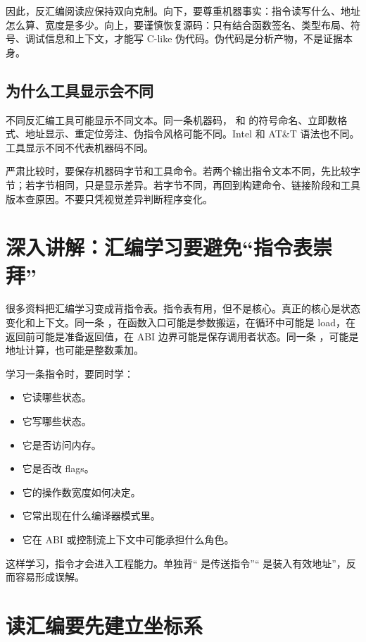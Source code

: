 因此，反汇编阅读应保持双向克制。向下，要尊重机器事实：指令读写什么、地址怎么算、宽度是多少。向上，要谨慎恢复源码：只有结合函数签名、类型布局、符号、调试信息和上下文，才能写 C-like 伪代码。伪代码是分析产物，不是证据本身。

\subsection{为什么工具显示会不同}

不同反汇编工具可能显示不同文本。同一条机器码， 和  的符号命名、立即数格式、地址显示、重定位旁注、伪指令风格可能不同。Intel 和 AT\&T 语法也不同。工具显示不同不代表机器码不同。

严肃比较时，要保存机器码字节和工具命令。若两个输出指令文本不同，先比较字节；若字节相同，只是显示差异。若字节不同，再回到构建命令、链接阶段和工具版本查原因。不要只凭视觉差异判断程序变化。

\section{深入讲解：汇编学习要避免“指令表崇拜”}

很多资料把汇编学习变成背指令表。指令表有用，但不是核心。真正的核心是状态变化和上下文。同一条 ，在函数入口可能是参数搬运，在循环中可能是 load，在返回前可能是准备返回值，在 ABI 边界可能是保存调用者状态。同一条 ，可能是地址计算，也可能是整数乘加。

学习一条指令时，要同时学：

\begin{itemize}
  \item 它读哪些状态。
  \item 它写哪些状态。
  \item 它是否访问内存。
  \item 它是否改 flags。
  \item 它的操作数宽度如何决定。
  \item 它常出现在什么编译器模式里。
  \item 它在 ABI 或控制流上下文中可能承担什么角色。
\end{itemize}

这样学习，指令才会进入工程能力。单独背“ 是传送指令”“ 是装入有效地址”，反而容易形成误解。

\section{读汇编要先建立坐标系}

